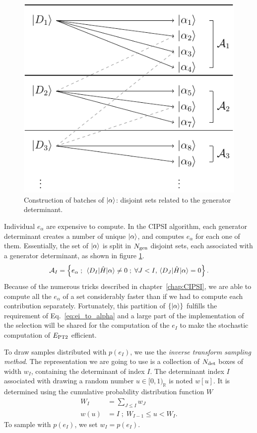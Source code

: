 \documentclass[./thesis.tex]{subfiles}
\begin{document}
\begin{figure}[h!]
	\begin{center}
		\includegraphics[width=0.5\columnwidth]{figures/pt2/a_sample}
	\end{center}
        \caption{Construction of batches of $\ket \alpha$: disjoint sets related to the generator determinant.}
        \label{fig:a_sample}
\end{figure}

Individual $e_\alpha$ are expensive to compute. In the CIPSI algorithm, each generator determinant creates a number of unique ${\ket{\alpha}}$, and computes $e_\alpha$ for each one of them.
Essentially, the set of ${\ket{\alpha}}$ is split in ${N_\text{gen}}$ disjoint sets, each associated with a generator determinant, as shown in figure \ref{fig:a_sample}.
\begin{equation}
 \mathcal{A}_I = \left \{
e_\alpha \; ; \; \mel{D_I}{\hat{H}}{\alpha} \neq 0 \; ; \;   \forall J < I, \mel{D_J}{\hat{H}}{\alpha} = 0
\right \}.
\end{equation}
Because of the numerous tricks described in chapter~\ref{chap:CIPSI}, we are able to compute all the $e_\alpha$ of a set considerably faster than if we had to compute each contribution separately.
Fortunately, this partition of $\{ {\ket{\alpha}} \}$ fulfills the requirement of Eq.~\eqref{eq:ei_to_alpha}
and a large part of the implementation of the selection will be shared for the computation of the $e_I$
to make the stochastic computation of $E_\text{PT2}$ efficient.

To draw samples distributed with $p(e_I)$, we use the \emph{inverse transform sampling method}.\cite{Devroye2013Nov}
The representation we are going to use is a collection of ${N_\text{det}}$ boxes of width $w_I$, containing the determinant of index $I$.
The determinant index $I$ associated with drawing a random number $u \in [0,1)_\mathbb{R}$ is noted $w[u]$. It is determined using the cumulative probability distribution function $W$
\begin{align}
W_I &= \sum_{J \leq I} w_J \\
w(u)& = I \; ; \; W_{I-1} \leq u < W_I.
\end{align}
To sample with $p(e_I)$, we set $w_I = p(e_I)$.
\end{document}
